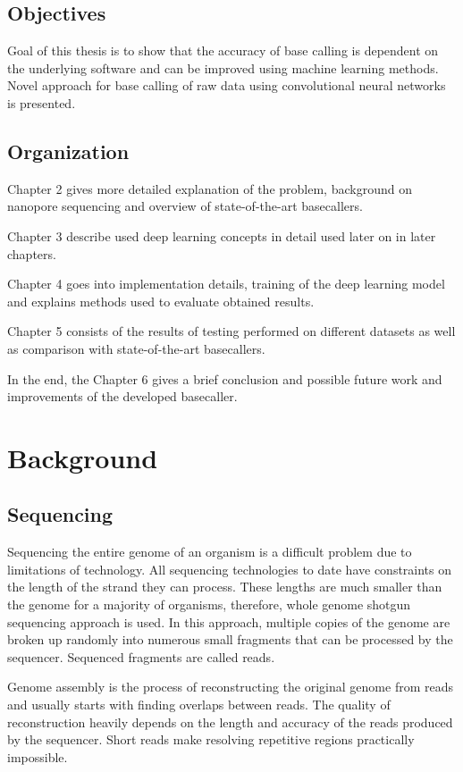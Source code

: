 \documentclass[times, utf8, diplomski, numeric, english]{fer}
\begin{document}
\section{Objectives}
Goal of this thesis is to show that the accuracy of base calling is dependent on the underlying software and can be improved using machine learning methods. Novel approach for base calling of raw data using convolutional neural networks is presented.
 
\section{Organization}
\indent Chapter 2 gives more detailed explanation of the problem, background on nanopore sequencing and overview of state-of-the-art basecallers.

Chapter 3 describe used deep learning concepts in detail used later on in later chapters.

Chapter 4 goes into implementation details, training of the deep learning model and explains methods used to evaluate obtained results. 

Chapter 5 consists of the results of testing performed on different datasets as well as comparison with state-of-the-art basecallers.

In the end, the Chapter 6 gives a brief conclusion and possible future work and improvements of the developed basecaller.

\chapter{Background}

\section{Sequencing}

Sequencing the entire genome of an organism is a difficult problem due to limitations of technology.
All sequencing technologies to date have constraints on the length of the strand they can process. 
These lengths are much smaller than the genome for a majority of organisms, therefore, whole genome shotgun sequencing approach is used. 
In this approach, multiple copies of the genome are broken up randomly into numerous small fragments that can be processed by the sequencer. Sequenced fragments are called reads.

Genome assembly is the process of reconstructing the original genome from reads and usually starts with finding overlaps between reads.
The quality of reconstruction heavily depends on the length and accuracy of the reads produced by the sequencer. Short reads make resolving repetitive regions practically impossible.
\end{document}
